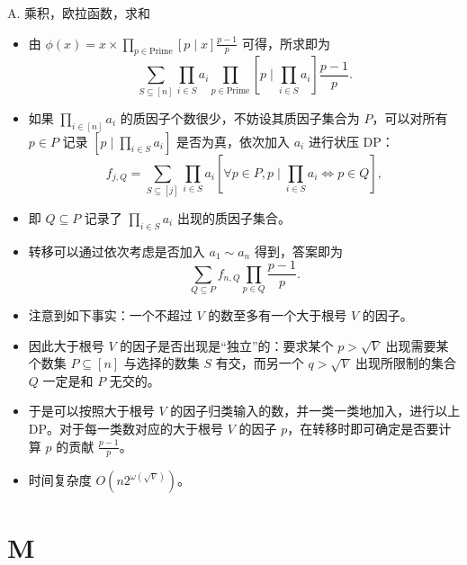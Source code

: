 \documentclass[9pt]{ctexbeamer}
\newcommand{\setParDis}{\setlength{\parskip}{6pt}}
\begin{document}
\begin{frame}
\setParDis

A. 乘积，欧拉函数，求和

\begin{itemize}
	\item 由 $\phi(x) = x \times \prod_{p \in \text{Prime}} [p \mid x] \frac{p-1}{p}$ 可得，所求即为 \[\sum_{S \subseteq [n]} \prod_{i \in S} a_i \prod_{p \in \text{Prime}} [p \mid \prod_{i \in S} a_i] \frac{p-1}{p}.\]
	\item 如果 $\prod_{i \in [n]} a_i$ 的质因子个数很少，不妨设其质因子集合为 $P$，可以对所有 $p \in P$ 记录 $[p \mid \prod_{i \in S} a_i]$ 是否为真，依次加入 $a_i$ 进行状压 DP：\[f_{j, Q} = \sum_{S \subseteq [j]} \prod_{i \in S} a_i [\forall p \in P, p \mid \prod_{i \in S} a_i \iff p \in Q],\]
	\item 即 $Q \subseteq P$ 记录了 $\prod_{i \in S} a_i$ 出现的质因子集合。
	\item 转移可以通过依次考虑是否加入 $a_1 \sim a_n$ 得到，答案即为 \[\sum_{Q \subseteq P} f_{n,Q} \prod_{p \in Q} \frac{p-1}{p}.\]
\end{itemize}

\end{frame}

\begin{frame}
\setParDis

\begin{itemize}
	\item 注意到如下事实：一个不超过 $V$ 的数至多有一个大于根号 $V$ 的因子。
	\item 因此大于根号 $V$ 的因子是否出现是“独立”的：要求某个 $p>\sqrt{V}$ 出现需要某个数集 $P \subseteq [n]$ 与选择的数集 $S$ 有交，而另一个 $q > \sqrt{V}$ 出现所限制的集合 $Q$ 一定是和 $P$ 无交的。
	\item 于是可以按照大于根号 $V$ 的因子归类输入的数，并一类一类地加入，进行以上 DP。对于每一类数对应的大于根号 $V$ 的因子 $p$，在转移时即可确定是否要计算 $p$ 的贡献 $\frac{p - 1}{p}$。
	\item 时间复杂度 $O(n 2 ^ {\omega(\sqrt{V})})$。
\end{itemize}

\end{frame}

\section{M}
\end{document}
